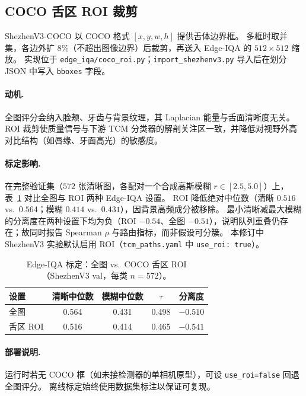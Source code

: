 \subsection{COCO 舌区 ROI 裁剪}
\label{sec:roi-zh}

ShezhenV3-COCO 以 COCO 格式 $[x,y,w,h]$ 提供舌体边界框。
多框时取并集，各边外扩 $8\%$（不超出图像边界）后裁剪，再送入 Edge-IQA 的 $512{\times}512$ 缩放。
实现位于 \texttt{edge\_iqa/coco\_roi.py}；\texttt{import\_shezhenv3.py} 导入后在划分 JSON 中写入 \texttt{bboxes} 字段。

\paragraph{动机.}
全图评分会纳入脸颊、牙齿与背景纹理，其 Laplacian 能量与舌面清晰度无关。
ROI 裁剪使质量信号与下游 TCM 分类器的解剖关注区一致，并降低对视野外高对比结构（如唇缘、牙面高光）的敏感度。

\paragraph{标定影响.}
在完整验证集（$572$ 张清晰图，各配对一个合成高斯模糊 $r{\in}[2.5,5.0]$）上，表~\ref{tab:roi-ablation-zh} 对比全图与 ROI 两种 Edge-IQA 设置。
ROI 降低绝对中位数（清晰 $0.516$ vs.\ $0.564$；模糊 $0.414$ vs.\ $0.431$），因背景高频成分被移除。
最小清晰减最大模糊的分离度在两种设置下均为负（ROI $-0.54$、全图 $-0.51$），说明队列重叠仍存在；故同时报告 Spearman $\rho$ 与路由指标，而非假设可分簇。
本修订中 ShezhenV3 实验默认启用 ROI（\texttt{tcm\_paths.yaml} 中 \texttt{use\_roi: true}）。

\begin{table}[t]
\centering
\caption{Edge-IQA 标定：全图 vs.\ COCO 舌区 ROI（ShezhenV3 val，每类 $n{=}572$）。}
\label{tab:roi-ablation-zh}
\small
\begin{tabular}{lcccc}
\hline
设置 & 清晰中位数 & 模糊中位数 & $\tau$ & 分离度 \\
\hline
全图 & 0.564 & 0.431 & 0.498 & $-0.510$ \\
舌区 ROI & 0.516 & 0.414 & 0.465 & $-0.541$ \\
\hline
\end{tabular}
\end{table}

\paragraph{部署说明.}
运行时若无 COCO 框（如未接检测器的单相机原型），可设 \texttt{use\_roi=false} 回退全图评分。
离线标定始终使用数据集标注以保证可复现。
